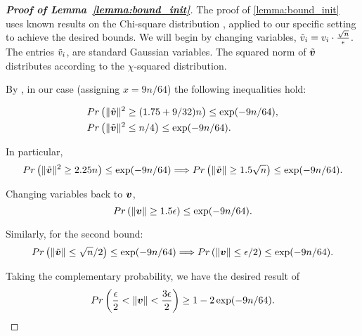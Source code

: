 \begin{proof}[\textbf{Proof of Lemma~\ref{lemma:bound_init}}]
The proof of \ref{lemma:bound_init} uses known results on the Chi-square distribution \cite{laurent2000adaptive}, applied to our specific setting to achieve the desired bounds.
We will begin by changing variables, $\tilde{{v}}_i = {v}_i\cdot \frac{\sqrt{n}}{\epsilon}$. The entries $\tilde{{v}}_i$, are standard Gaussian variables. The squared norm of $\tilde{{\bm{v}}}$ distributes according to the $\chi$-squared distribution.

By \cite[Lemma 1]{laurent2000adaptive}, in our case (assigning $x= 9n/64$) the following inequalities hold:

\begin{align}
    &Pr\left(\|\tilde{{\bm{v}}}\|^2 \geq (1.75 +9/32) n\right) \leq \exp(-9n/64),\\
    &Pr\left(\|\tilde{{\bm{v}}}\|^2 \leq n/4\right) \leq \exp(-9n/64).
\end{align}

In particular,
\begin{equation}
    Pr\left(\|\tilde{{\bm{v}}}\|^2 \geq 2.25 n\right) \leq \exp(-9n/64) \Longrightarrow Pr\left(\|\tilde{{\bm{v}}}\| \geq 1.5 \sqrt{n}\right) \leq \exp(-9n/64).
\end{equation}

Changing variables back to ${\bm{v}}$,
\begin{equation}
    Pr\left(\|{\bm{v}}\| \geq 1.5 \epsilon\right) \leq \exp(-9n/64).
\end{equation}

Similarly, for the second bound:
\begin{align}
    Pr\left(\|\tilde{{\bm{v}}}\| \leq \sqrt{n}/2\right) \leq \exp(-9n/64)
    \Longrightarrow Pr\left(\|{\bm{v}}\| \leq \epsilon/2\right) \leq \exp(-9n/64).
\end{align}

Taking the complementary probability, we have the desired result of
\begin{equation}
Pr\left(\frac{\epsilon}{2}< \|{\bm{v}}\| < \frac{3\epsilon}{2}\right) \geq 1- 2 \exp(-9n/64 ).
\end{equation}
\end{proof}

